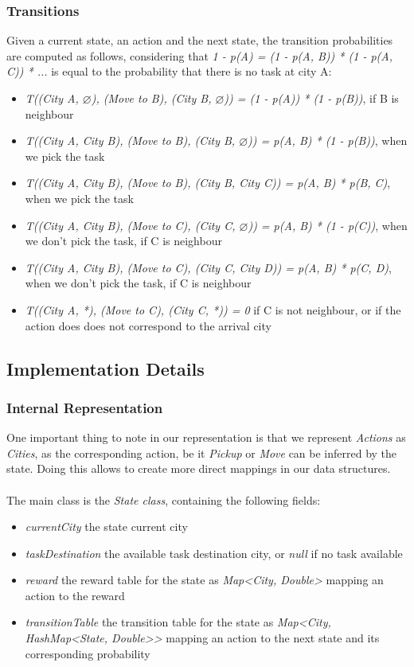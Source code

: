 \documentclass[11pt]{article}
\begin{document}
\subsubsection{Transitions}
Given a current state, an action and the next state, the transition probabilities are computed as follows, considering that \textit{1 - p(A) = (1 - p(A, B)) * (1 - p(A, C)) * ...} is equal to the probability that there is no task at city A:
\begin{itemize}
	\item \textit{T((City A, $\varnothing$), (Move to B), (City B, $\varnothing$)) = (1 - p(A)) * (1 - p(B))}, if B is neighbour
	\item \textit{T((City A, City B), (Move to B), (City B, $\varnothing$)) = p(A, B) * (1 - p(B))}, when we pick the task
	\item \textit{T((City A, City B), (Move to B), (City B, City C)) = p(A, B) * p(B, C)}, when we pick the task
	\item \textit{T((City A, City B), (Move to C), (City C, $\varnothing$)) = p(A, B) * (1 - p(C))}, when we don't pick the task, if C is neighbour
	\item \textit{T((City A, City B), (Move to C), (City C, City D)) = p(A, B) * p(C, D)}, when we don't pick the task, if C is neighbour
	\item \textit{T((City A, *), (Move to C), (City C, *)) = 0} if C is not neighbour, or if the action does does not correspond to the arrival city
\end{itemize}

\subsection{Implementation Details}
\subsubsection{Internal Representation}
One important thing to note in our representation is that we represent \textit{Actions} as \textit{Cities}, as the corresponding action, be it \textit{Pickup} or \textit{Move} can be inferred by the state. Doing this allows to create more direct mappings in our data structures.
\\
\\
The main class is the \textit{State class}, containing the following fields: 
\begin{itemize}
	\item \textit{currentCity} the state current city
	\item \textit{taskDestination} the available task destination city, or \textit{null} if no task available
	\item \textit{reward} the reward table for the state as \textit{Map<City, Double>} mapping an action to the reward
	\item \textit{transitionTable} the transition table for the state as \textit{Map<City, HashMap<State, Double>{}>} mapping an action to the next state and its corresponding probability
\end{itemize}
\end{document}
